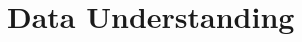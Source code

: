 \section{Data Understanding}

\newcommand{\fieldcard}[3]{%
  \infocard{\dimexpr.5\linewidth-17pt\relax}{1.74cm}{%
    {\large\bfseries\color{hustred}#1}\\[1pt]
    {\footnotesize\bfseries #2}\\[1pt]
    {\scriptsize\color{inkgray}#3}}%
}

